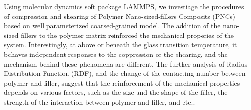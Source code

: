  Using molecular dynamics soft package LAMMPS, we investiage the procedures of compression and shearing of Polymer Nano-sized-fillers Composits (PNCs) based on well parameterized coarsed-grained model. The addition of the nano-sized fillers to the polymer matrix reinforced the mechanical properies of the system. Interestingly, at above or beneath the glass transition temperature, it behaves independent responses to the coppression or the shearing, and the mechanism behind these phenomena are different. The further analysis of Radius Distribution Function (RDF), and the change of the contacting number between polymer and filler, suggest that the reinforcement of the mechanical properties depends on various factors, such as the size and the shape of the filler, the strength of the interaction between polymer and filler, and etc.. 